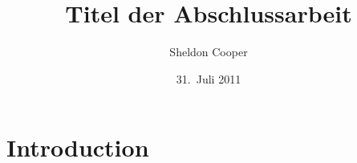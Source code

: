 \documentclass[encoding=utf8,british]{tumphthesis}
\title{Titel der Abschlussarbeit}
\author{Sheldon Cooper}
\date{31.~Juli 2011}
\begin{document}

\frontmatter
\maketitle
\tableofcontents

\mainmatter










\chapter{Introduction}
\label{sec:intro}
\end{document}
